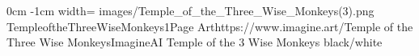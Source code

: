 \documentclass[letterpaper,openany,twoside,twocolumn]{book}
\begin{document}
	\DungeonSheetGeometry

		{0cm}%
		{-1cm}%
		{width=\paperwidth}%
		{images/Temple_of_the_Three_Wise_Monkeys(3).png}%
		{%
			{TempleoftheThreeWiseMonkeys1}{Page \thepage}{Art}{https://www.imagine.art/}{Temple of the Three Wise Monkeys}{ImagineAI}%
		}%
		{Temple of the 3 Wise Monkeys}%
		{black/white}%
	
	
\end{document}
